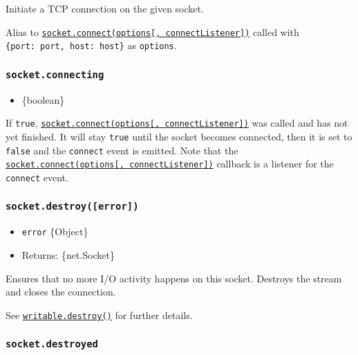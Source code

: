 Initiate a TCP connection on the given socket.

Alias to
\hyperref[socketconnectoptions-connectlistener]{\texttt{socket.connect(options{[},\ connectListener{]})}}
called with \texttt{\{port:\ port,\ host:\ host\}} as \texttt{options}.

\subsubsection{\texorpdfstring{\texttt{socket.connecting}}{socket.connecting}}\label{socket.connecting}

\begin{itemize}
\tightlist
\item
  \{boolean\}
\end{itemize}

If \texttt{true},
\hyperref[socketconnectoptions-connectlistener]{\texttt{socket.connect(options{[},\ connectListener{]})}}
was called and has not yet finished. It will stay \texttt{true} until
the socket becomes connected, then it is set to \texttt{false} and the
\texttt{\textquotesingle{}connect\textquotesingle{}} event is emitted.
Note that the
\hyperref[socketconnectoptions-connectlistener]{\texttt{socket.connect(options{[},\ connectListener{]})}}
callback is a listener for the
\texttt{\textquotesingle{}connect\textquotesingle{}} event.

\subsubsection{\texorpdfstring{\texttt{socket.destroy({[}error{]})}}{socket.destroy({[}error{]})}}\label{socket.destroyerror}

\begin{itemize}
\tightlist
\item
  \texttt{error} \{Object\}
\item
  Returns: \{net.Socket\}
\end{itemize}

Ensures that no more I/O activity happens on this socket. Destroys the
stream and closes the connection.

See \href{stream.md\#writabledestroyerror}{\texttt{writable.destroy()}}
for further details.

\subsubsection{\texorpdfstring{\texttt{socket.destroyed}}{socket.destroyed}}\label{socket.destroyed}

